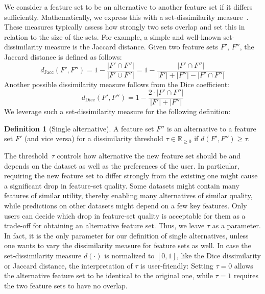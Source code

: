 \documentclass{article}
\theoremstyle{definition}
\newtheorem{definition}{Definition}
\begin{document}
We consider a feature set to be an alternative to another feature set if it differs sufficiently.
Mathematically, we express this with a set-dissimilarity measure~\cite{choi2010survey, egghe2009new}.
These measures typically assess how strongly two sets overlap and set this in relation to the size of the sets.
For example, a simple and well-known set-dissimilarity measure is the Jaccard distance.
Given two feature sets $F'$, $F''$, the Jaccard distance is defined as follows:
%
\begin{equation}
	d_{\text{Jacc}}(F',F'') = 1 - \frac{|F' \cap F''|}{|F' \cup F''|} = 1 - \frac{|F' \cap F''|}{|F'| + |F''| - |F' \cap F''|}
	\label{eq:afs:jaccard}
\end{equation}
%
Another possible dissimilarity measure follows from the Dice coefficient:
%
\begin{equation}
	d_{\text{Dice}}(F',F'') = 1 - \frac{2 \cdot |F' \cap F''|}{|F'| + |F''|}
	\label{eq:afs:dice}
\end{equation}
%
We leverage such a set-dissimilarity measure for the following definition:
%
\begin{definition}[Single alternative]
	A feature set $F''$ is an alternative to a feature set $F'$ (and vice versa) for a dissimilarity threshold $\tau \in \mathbb{R}_{\geq 0}$ if $d(F',F'') \geq \tau$.
	\label{def:afs:single-alternative}
\end{definition}
%
The threshold~$\tau$ controls how alternative the new feature set should be and depends on the dataset as well as the preferences of the user.
In particular, requiring the new feature set to differ strongly from the existing one might cause a significant drop in feature-set quality.
Some datasets might contain many features of similar utility, thereby enabling many alternatives of similar quality, while predictions on other datasets might depend on a few key features.
Only users can decide which drop in feature-set quality is acceptable for them as a trade-off for obtaining an alternative feature set.
Thus, we leave $\tau$ as a parameter.
In fact, it is the only parameter for our definition of single alternatives, unless one wants to vary the dissimilarity measure for feature sets as well.
In case the set-dissimilarity measure $d(\cdot)$ is normalized to $[0,1]$, like the Dice dissimilarity or Jaccard distance, the interpretation of $\tau$ is user-friendly:
Setting $\tau=0$ allows the alternative feature set to be identical to the original one, while $\tau=1$ requires the two feature sets to have no overlap.
\end{document}
